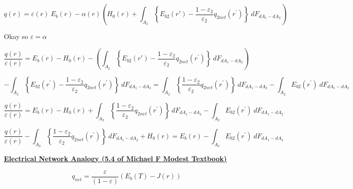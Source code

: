 \documentclass[12pt]{article}
\renewcommand{\_}{\kern-1.5pt\textunderscore\kern-1.5pt}
\begin{document}
\vspace{\baselineskip}
 \[ q \left( r \right) = \varepsilon  \left( r \right) ~E_{b} \left( r \right) - \alpha  \left( r \right)  \left( H_{0} \left( r \right)  + \int _{A_{2}}^{} \left\{ E_{b2} \left( r' \right) -\frac{1- \varepsilon _{2}}{ \varepsilon _{2}}q_{2net} \left( r^{'} \right)  \right\rbrace ~dF_{dA_{1}-dA_{2}} \right)  \] \par

Okay so  \(  \varepsilon = \alpha  \) \par

 \[ \frac{q \left( r \right) }{ \varepsilon  \left( r \right) }= E_{b} \left( r \right) -H_{0} \left( r \right) - \left(  \int _{A_{2}}^{} \left\{ E_{b2} \left( r' \right) -\frac{1- \varepsilon _{2}}{ \varepsilon _{2}}q_{2net} \left( r^{'} \right)  \right\rbrace ~dF_{dA_{1}-dA_{2}} \right)  \] \par


\vspace{\baselineskip}
 \[ - \int _{A_{2}}^{} \left\{ E_{b2} \left( r^{'} \right) -\frac{1- \varepsilon _{2}}{ \varepsilon _{2}}q_{2net} \left( r^{'} \right)  \right\rbrace ~dF_{dA_{1}-dA_{2}}= \int _{A_{2}}^{} \left\{ \frac{1- \varepsilon _{2}}{ \varepsilon _{2}}q_{2net} \left( r^{'} \right)  \right\rbrace ~dF_{dA_{1}-dA_{2}}- \int _{A_{2}}^{}E_{b2} \left( r^{'} \right) ~dF_{dA_{1}-dA_{2}} \] \par

 \[ \frac{q \left( r \right) }{ \varepsilon  \left( r \right) }= E_{b} \left( r \right) -H_{0} \left( r \right) + \int _{A_{2}}^{} \left\{ \frac{1- \varepsilon _{2}}{ \varepsilon _{2}}q_{2net} \left( r^{'} \right)  \right\rbrace ~dF_{dA_{1}-dA_{2}}- \int _{A_{2}}^{}E_{b2} \left( r^{'} \right) ~dF_{dA_{1}-dA_{2}} \] \par

 \[ \frac{q \left( r \right) }{ \varepsilon  \left( r \right) }- \int _{A_{2}}^{} \left\{ \frac{1- \varepsilon _{2}}{ \varepsilon _{2}}q_{2net} \left( r^{'} \right)  \right\rbrace ~dF_{dA_{1}-dA_{2}}+H_{0} \left( r \right) = E_{b} \left( r \right) - \int _{A_{2}}^{}E_{b2} \left( r^{'} \right) ~dF_{dA_{1}-dA_{2}} \] \par

\textbf{\uline{Electrical Network Analogy (5.4 of Michael F Modest Textbook)}}\par

 \[ q_{net}=\frac{ \varepsilon }{ \left( 1- \varepsilon  \right) } \left( E_{b} \left( T \right) -J \left( r \right)  \right)  \] \par
\end{document}
